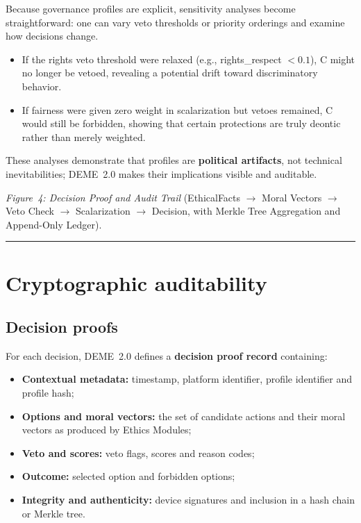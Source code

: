\documentclass[11pt]{article}
\begin{document}
Because governance profiles are explicit, sensitivity analyses become straightforward: one can vary veto thresholds or priority orderings and examine how decisions change.

\begin{itemize}
  \item If the rights veto threshold were relaxed (e.g., rights\_respect $< 0.1$), C might no longer be vetoed, revealing a potential drift toward discriminatory behavior.
  \item If fairness were given zero weight in scalarization but vetoes remained, C would still be forbidden, showing that certain protections are truly deontic rather than merely weighted.
\end{itemize}

These analyses demonstrate that profiles are \textbf{political artifacts}, not technical inevitabilities; DEME~2.0 makes their implications visible and auditable.

\medskip
\noindent\emph{Figure~4: Decision Proof and Audit Trail} (EthicalFacts $\to$ Moral Vectors $\to$ Veto Check $\to$ Scalarization $\to$ Decision, with Merkle Tree Aggregation and Append-Only Ledger).

\hrule
\vspace{1em}

\section{Cryptographic auditability}

\subsection{Decision proofs}

For each decision, DEME~2.0 defines a \textbf{decision proof record} containing:

\begin{itemize}
  \item \textbf{Contextual metadata:} timestamp, platform identifier, profile identifier and profile hash;
  \item \textbf{Options and moral vectors:} the set of candidate actions and their moral vectors as produced by Ethics Modules;
  \item \textbf{Veto and scores:} veto flags, scores and reason codes;
  \item \textbf{Outcome:} selected option and forbidden options;
  \item \textbf{Integrity and authenticity:} device signatures and inclusion in a hash chain or Merkle tree.
\end{itemize}
\end{document}
